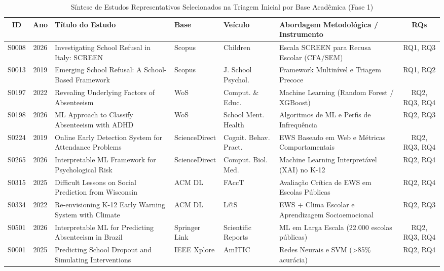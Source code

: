 \documentclass[journal,10pt,a4paper]{IEEEtran}
\begin{document}
\begin{table}[!t]
\caption{Síntese de Estudos Representativos Selecionados na Triagem Inicial por Base Acadêmica (Fase 1)}
\label{tab:amostra_selecionados}
\centering
\footnotesize
\renewcommand{\arraystretch}{0.88}
\begin{tabularx}{\textwidth}{cc>{\RaggedRight\arraybackslash\hsize=1.35\hsize}Xll>{\RaggedRight\arraybackslash\hsize=0.65\hsize}Xc}
\toprule
\textbf{ID} & \textbf{Ano} & \textbf{Título do Estudo} & \textbf{Base} & \textbf{Veículo} & \textbf{Abordagem Metodológica / Instrumento} & \textbf{RQs} \\
\midrule
S0008 & 2026 & Investigating School Refusal in Italy: SCREEN & Scopus & Children & Escala SCREEN para Recusa Escolar (CFA/SEM) & RQ1, RQ3 \\
S0013 & 2019 & Emerging School Refusal: A School-Based Framework & Scopus & J. School Psychol. & Framework Multinível e Triagem Precoce & RQ1, RQ2 \\
S0197 & 2022 & Revealing Underlying Factors of Absenteeism & WoS & Comput. \& Educ. & Machine Learning (Random Forest / XGBoost) & RQ2, RQ3, RQ4 \\
S0198 & 2026 & ML Approach to Classify Absenteeism with ADHD & WoS & School Ment. Health & Algoritmos de ML e Perfis de Infrequência & RQ2, RQ3 \\
S0224 & 2019 & Online Early Detection System for Attendance Problems & ScienceDirect & Cognit. Behav. Pract. & EWS Baseado em Web e Métricas Comportamentais & RQ2, RQ3, RQ4 \\
S0265 & 2026 & Interpretable ML Framework for Psychological Risk & ScienceDirect & Comput. Biol. Med. & Machine Learning Interpretável (XAI) no K-12 & RQ2, RQ4 \\
S0315 & 2025 & Difficult Lessons on Social Prediction from Wisconsin & ACM DL & FAccT & Avaliação Crítica de EWS em Escolas Públicas & RQ2, RQ4 \\
S0334 & 2022 & Re-envisioning K-12 Early Warning System with Climate & ACM DL & L@S & EWS + Clima Escolar e Aprendizagem Socioemocional & RQ2, RQ3 \\
S0501 & 2026 & Interpretable ML for Predicting Absenteeism in Brazil & Springer Link & Scientific Reports & ML em Larga Escala (22.000 escolas públicas) & RQ2, RQ3, RQ4 \\
S0001 & 2025 & Predicting School Dropout and Simulating Interventions & IEEE Xplore & AmITIC & Redes Neurais e SVM (>85\% acurácia) & RQ2, RQ4 \\
\bottomrule
\end{tabularx}
\end{table}
\end{document}
